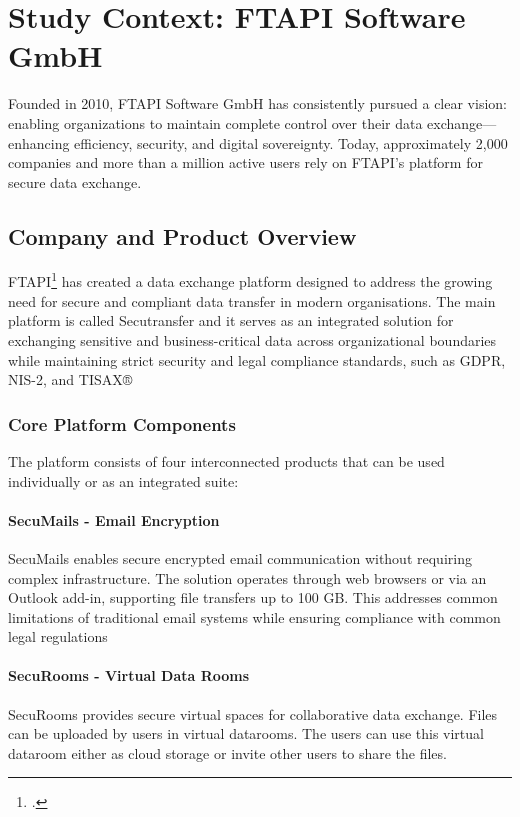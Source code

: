 \chapter{Study Context: FTAPI Software GmbH}\label{chapter:ftapi}
Founded in 2010, FTAPI Software GmbH has consistently pursued a clear vision: enabling organizations to maintain complete control over their data exchange—enhancing efficiency, security, and digital sovereignty. Today, approximately 2,000 companies and more than a million active users rely on FTAPI's platform for secure data exchange.


\section{Company and Product Overview}
FTAPI\footcite{ftapi2025} has created a data exchange platform designed to address the growing need for secure and compliant data transfer in modern organisations. The main platform is called Secutransfer and it serves as an integrated solution for exchanging sensitive and business-critical data across organizational boundaries while maintaining strict security and legal compliance standards, such as GDPR, NIS-2, and TISAX® 

\subsection{Core Platform Components}
The platform consists of four interconnected products that can be used individually or as an integrated suite:

\subsubsection{SecuMails - Email Encryption}\label{sec:secumails}
SecuMails enables secure encrypted email communication without requiring complex infrastructure. The solution operates through web browsers or via an Outlook add-in, supporting file transfers up to 100 GB. This addresses common limitations of traditional email systems while ensuring compliance with common legal regulations

\subsubsection{SecuRooms - Virtual Data Rooms}\label{sec:securooms}
SecuRooms provides secure virtual spaces for collaborative data exchange. Files can be uploaded by users in virtual datarooms. The users can use this virtual dataroom either as cloud storage or invite other users to share the files. 

